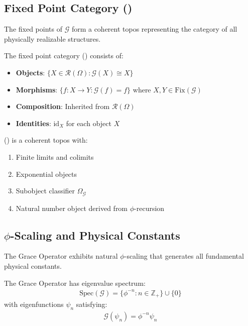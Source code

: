 \subsection{Fixed Point Category ()}

The fixed points of $\mathcal{G}$ form a coherent topos representing the category of all physically realizable structures.

\begin{definition}
\label{def:fixed_point_category}
The fixed point category () consists of:
\begin{itemize}
    \item \textbf{Objects}: $\{X \in \mathcal{R}(\Omega) : \mathcal{G}(X) \cong X\}$
    \item \textbf{Morphisms}: $\{f: X \to Y : \mathcal{G}(f) = f\}$ where $X, Y \in \text{Fix}(\mathcal{G})$
    \item \textbf{Composition}: Inherited from $\mathcal{R}(\Omega)$
    \item \textbf{Identities}: $\text{id}_X$ for each object $X$
\end{itemize}
\end{definition}

\begin{theorem}
() is a coherent topos with:
\begin{enumerate}
    \item Finite limits and colimits
    \item Exponential objects
    \item Subobject classifier $\Omega_{\mathcal{G}}$
    \item Natural number object derived from $\phi$-recursion
\end{enumerate}
\end{theorem}

\subsection{$\phi$-Scaling and Physical Constants}

The Grace Operator exhibits natural $\phi$-scaling that generates all fundamental physical constants.

\begin{lemma}
\label{lem:phi_eigenvalues}
The Grace Operator has eigenvalue spectrum:
\begin{align}
\text{Spec}(\mathcal{G}) = \{\phi^{-n} : n \in \mathbb{Z}_+\} \cup \{0\}
\end{align}
with eigenfunctions $\psi_n$ satisfying:
\begin{align}
\mathcal{G}(\psi_n) = \phi^{-n} \psi_n
\end{align}
\end{lemma}

